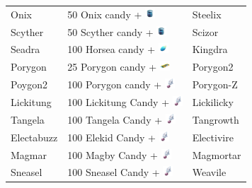 \begin{table}[ht]
\begin{center}
\begin{tabular}{lll}
    Onix & 50 Onix candy + \includegraphics[width=1em,height=1em]{images/metalcoat.png} & Steelix \\
    Scyther & 50 Scyther candy + \includegraphics[width=1em,height=1em]{images/metalcoat.png} & Scizor \\
    Seadra & 100 Horsea candy + \includegraphics[width=1em,height=1em]{images/dragonscale.png} & Kingdra \\
    Porygon & 25 Porygon candy + \includegraphics[width=1em,height=1em]{images/upgrade.png} & Porygon2 \\
    Poygon2 & 100 Porygon candy + \includegraphics[width=1em,height=1em]{images/sinnohstone.png} & Porygon-Z \\
    Lickitung & 100 Lickitung Candy + \includegraphics[width=1em,height=1em]{images/sinnohstone.png} & Lickilicky \\
    Tangela	& 100 Tangela Candy + \includegraphics[width=1em,height=1em]{images/sinnohstone.png} & Tangrowth \\
    Electabuzz & 100 Elekid Candy + \includegraphics[width=1em,height=1em]{images/sinnohstone.png} & Electivire	\\
    Magmar & 100 Magby Candy + \includegraphics[width=1em,height=1em]{images/sinnohstone.png} & Magmortar	\\
    Sneasel & 100 Sneasel Candy + \includegraphics[width=1em,height=1em]{images/sinnohstone.png} & Weavile	\\

\end{tabular}
\end{center}
\end{table}
